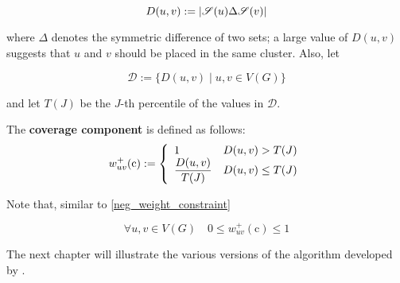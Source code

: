\begin{equation}
    D(u, v) := \abs{\mathscr{S}(u) \Delta \mathscr{S}(v)}
\end{equation}

where $\Delta$ denotes the symmetric difference of two sets; a large value of $D(u, v)$ suggests that $u$ and $v$ should be placed in the same cluster. Also, let

\begin{equation}
    \mathscr{D} := \{D(u, v) \mid u, v \in V(G)\}
\end{equation}

and let $T(J)$ be the $J$-th percentile of the values in $\mathscr{D}$.

\begin{definition} \label{co_comp}
    The \textbf{coverage component} is defined as follows: $$w_{uv}^+(\mathrm c) := \soe{ll}{1 & D(u, v) > T(J) \\ \dfrac{D(u, v)}{T(J)} & D(u, v) \le T(J)}$$
\end{definition}

Note that, similar to \cref{neg_weight_constraint}

\begin{equation}
    \forall u, v \in V(G) \quad 0 \le w_{uv}^+(\mathrm c) \le 1
\end{equation}

The next chapter will illustrate the various versions of the algorithm developed by \textcite{c3}.

\cleardoublepage
